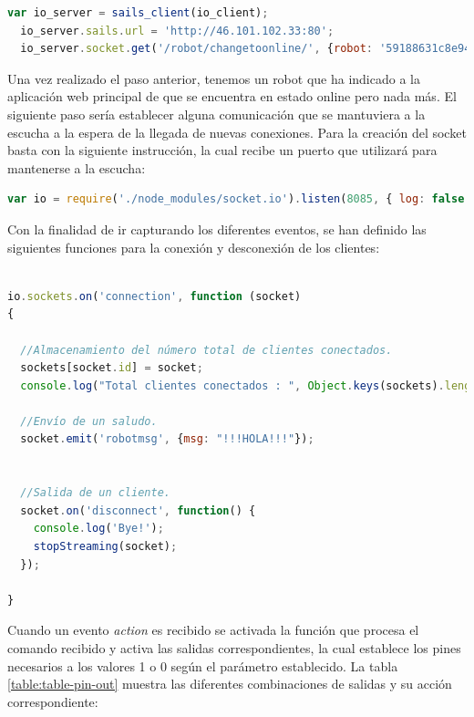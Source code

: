 \begin{lstlisting}[language=JavaScript]
  var io_server = sails_client(io_client);
  io_server.sails.url = 'http://46.101.102.33:80';
  io_server.socket.get('/robot/changetoonline/', {robot: '59188631c8e94ba54f7a4bdc', online: true});
\end{lstlisting}



Una vez realizado el paso anterior, tenemos un robot que ha indicado a la aplicación web principal de que se encuentra en estado online pero nada más. El siguiente paso sería establecer alguna comunicación que se mantuviera a la escucha a 
la espera de la llegada de nuevas conexiones. Para la creación del socket basta con la siguiente instrucción, la cual recibe un puerto que utilizará para mantenerse a la escucha:\\

\begin{lstlisting}[language=JavaScript]
  var io = require('./node_modules/socket.io').listen(8085, { log: false });
\end{lstlisting}


Con la finalidad de ir capturando los diferentes eventos, se han definido las siguientes funciones para la conexión y desconexión de los clientes:\\

\begin{lstlisting}[language=JavaScript]

io.sockets.on('connection', function (socket)
{

  //Almacenamiento del número total de clientes conectados.
  sockets[socket.id] = socket;
  console.log("Total clientes conectados : ", Object.keys(sockets).length);
  
  //Envío de un saludo.
  socket.emit('robotmsg', {msg: "!!!HOLA!!!"});


  //Salida de un cliente.
  socket.on('disconnect', function() {
    console.log('Bye!');
    stopStreaming(socket);
  });  
  
}
\end{lstlisting}

Cuando un evento \emph{action} es recibido se activada la función que procesa el comando recibido y activa las salidas correspondientes, la cual establece los pines necesarios a los valores
1 o 0 según el parámetro establecido. La tabla \ref{table:table-pin-out} muestra las diferentes combinaciones de salidas y su acción correspondiente:

